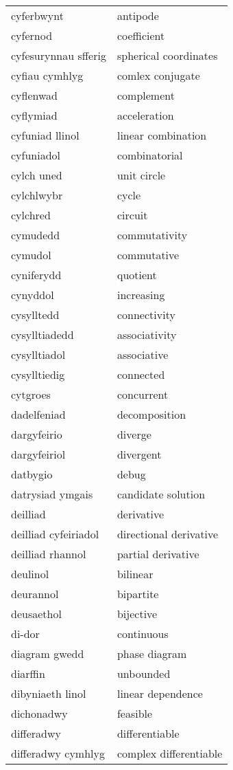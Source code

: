 \begin{supertabular}{p{0.22\textwidth}p{0.22\textwidth}}
cyferbwynt & antipode \\
cyfernod & coefficient \\
cyfesurynnau sfferig & spherical coordinates \\
cyfiau cymhlyg & comlex conjugate \\
cyflenwad & complement \\
cyflymiad & acceleration \\
cyfuniad llinol & linear combination \\
cyfuniadol & combinatorial \\
cylch uned & unit circle \\
cylchlwybr & cycle \\
cylchred & circuit \\
cymudedd & commutativity \\
cymudol & commutative \\
cyniferydd & quotient \\
cynyddol & increasing \\
cysylltedd & connectivity \\
cysylltiadedd & associativity \\
cysylltiadol & associative \\
cysylltiedig & connected \\
cytgroes & concurrent \\
dadelfeniad & decomposition \\
dargyfeirio & diverge \\
dargyfeiriol & divergent \\
datbygio & debug \\
datrysiad ymgais & candidate solution \\
deilliad & derivative \\
deilliad cyfeiriadol & directional derivative \\
deilliad rhannol & partial derivative \\
deulinol & bilinear \\
deurannol & bipartite \\
deusaethol & bijective \\
di-dor & continuous \\
diagram gwedd & phase diagram \\
diarffin & unbounded \\
dibyniaeth linol & linear dependence \\
dichonadwy & feasible \\
differadwy & differentiable \\
differadwy cymhlyg & complex differentiable \\

\end{supertabular}
